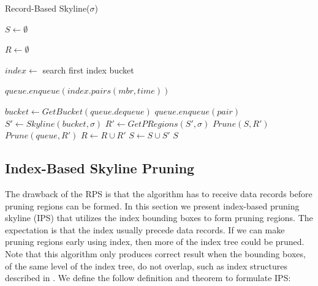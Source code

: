 \begin{algorithm}[t]
\caption{Record-Based Skyline($\sigma$)} \label{alg:RBSkyline}
\begin{algorithmic}[1]

\STATE $S \gets \emptyset$

\STATE $R \gets \emptyset$

\STATE $index \gets$ search first index bucket

\STATE $queue.enqueue(index.pairs(mbr, time))$

    \STATE $bucket \gets GetBucket(queue.dequeue)$
                \STATE $queue.enqueue(pair)$
            \ENDIF
        \ENDFOR
    \ELSE
        \STATE $S' \gets Skyline(bucket, \sigma)$
        \STATE $R' \gets GetPRegions(S', \sigma)$
        \STATE $Prune(S, R')$
        \STATE $Prune(queue, R')$
        \STATE $R \gets R \cup R'$
        \STATE $S \gets S \cup S'$
    \ENDIF
\ENDWHILE \RETURN $S$
\end{algorithmic}
\end{algorithm}


\subsection{Index-Based Skyline Pruning}\label{sec-IPS}

The drawback of the RPS is that the algorithm has to receive data records before pruning regions can be formed. In this section we present index-based pruning skyline (IPS) that utilizes the index bounding boxes to form pruning regions. The expectation is that the index usually precede data records. If we can make pruning regions early using index, then more of the index tree could be pruned. Note that this algorithm only produces correct result when the bounding boxes, of the same level of the index tree, do not overlap, such as index structures described in \cite{DBLP:conf/vldb/SellisRF87}\cite{DBLP:journals/acta/FinkelB74}\cite{DBLP:conf/compgeom/Bentley90}. We define the follow definition and theorem to formulate IPS:



